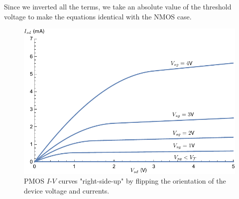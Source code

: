 Since we inverted all the terms, we take an absolute value of the threshold voltage to make the equations identical with the NMOS case.  
\begin{figure}[tb]
\centering
\includegraphics[width=.75\columnwidth]{ids_pmos_negative}
\caption{PMOS $I$-$V$ curves "right-side-up" by flipping the orientation of the device voltage and currents.}
\label{fig:ids_pmos_negative}
\end{figure}
